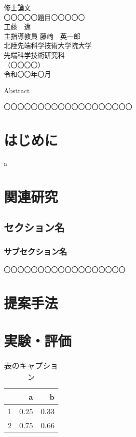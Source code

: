 \documentclass[12pt,a4j,book]{jlreq}
\begin{document}
        
    \thispagestyle{empty}
    \begin{center}
    修士論文\\%
    \vfill
    〇〇〇〇〇題目〇〇〇〇〇\\
    \vfill
    工藤　遼\\
    \vfill
    主指導教員  藤﨑　英一郎\\
    \vfill
    北陸先端科学技術大学院大学\\
    先端科学技術研究科\\
    （〇〇〇〇）\\ %
    \vfill
    令和〇〇年〇月\\ %
    \vfill
    \end{center}
    \clearpage
    \centerline{Abstract}
    〇〇〇〇〇〇〇〇〇〇〇〇〇〇〇〇〇〇〇
    \clearpage
    \tableofcontents\thispagestyle{empty}%
    \listoffigures\thispagestyle{empty}%
    \listoftables\thispagestyle{empty}%
    \clearpage
    
    \chapter{はじめに}
    a
    \chapter{関連研究}
    \section{セクション名}
    \subsection{サブセクション名}
    〇〇〇〇〇〇〇〇〇〇〇〇〇〇〇〇〇〇
    \chapter{提案手法}
    
    \chapter{実験・評価}
    \begin{table}
    \centering
    \begin{tabular}{r|rr}
    & a & b\\ \hline
    1& 0.25 & 0.33\\
    2& 0.75 & 0.66\\
    \end{tabular}
    \caption{表のキャプション}\label{table1}
    \end{table}
\end{document}
